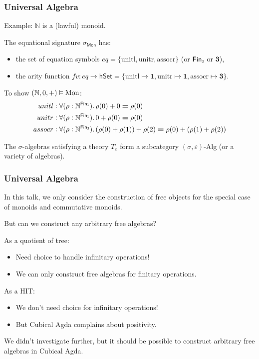 \documentclass[9pt]{beamer}
\begin{document}
\begin{frame}
\frametitle{Universal Algebra}
Example: $\mathbb{N}$ is a (lawful) \alert{monoid}.

The equational signature $\sigma_{\mathsf{Mon}}$ has:
\begin{itemize}
    \item the set of \alert{equation symbols} $eq = \{\text{unitl}, \text{unitr}, \text{assocr}\}$
    (or $\Fin[3]$ or $\mathbf{3}$),
    \item the \alert{arity function}
    $fv : eq \rightarrow \mathsf{hSet} = \{\text{unitl} \mapsto \mathbf{1}, \text{unitr} \mapsto \mathbf{1}, \text{assocr} \mapsto \mathbf{3}\}$.
\end{itemize}

To show $(\mathbb{N},0,+) \vDash \text{Mon}$:
\begin{align*}
unitl  & : \forall (\rho : \Nat^{\Fin[1]}). \, \rho(0) + 0 \id \rho(0) \\
unitr  & : \forall (\rho : \Nat^{\Fin[1]}). \, 0 + \rho(0) \id \rho(0) \\
assocr & : \forall (\rho : \Nat^{\Fin[3]}). \, (\rho(0) + \rho(1)) + \rho(2) \id \rho(0) + (\rho(1) + \rho(2))
\end{align*} 

The $\sigma$-algebras satisfying a theory $T_{\varepsilon}$ form a subcategory $(\sigma,\varepsilon)$-Alg (or a variety of algebras).
\end{frame}

\begin{frame}
\frametitle{Universal Algebra}
In this talk, we only consider the construction of free objects for the special case of \alert{monoids} and \alert{commutative monoids}.

But can we construct any arbitrary free algebras?

As a quotient of tree:
\begin{itemize}
  \item Need choice to handle \alert{infinitary} operations!
  \item We can only construct free algebras for \alert{finitary} operations.  
\end{itemize} 

As a HIT:
\begin{itemize}
  \item We \alert{don't} need choice for \alert{infinitary} operations!
  \item But Cubical Agda complains about positivity.
\end{itemize}

We didn't investigate further, but it should be possible to construct arbitrary free algebras
in Cubical Agda.

\end{frame}
\end{document}
